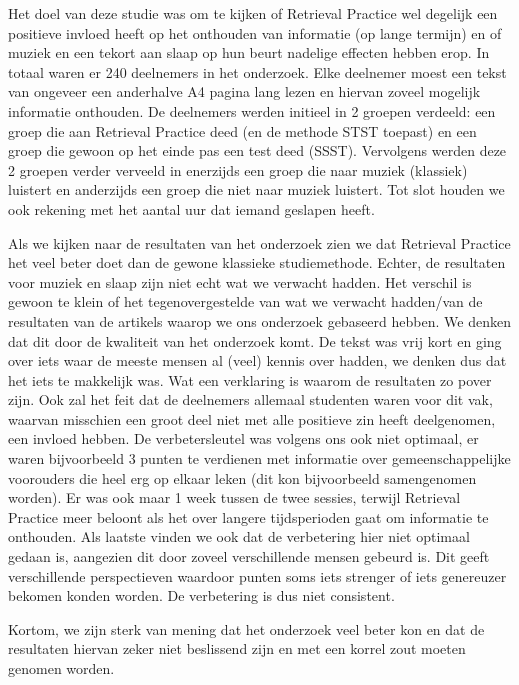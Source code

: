 \documentclass{hogent-article}
\begin{document}
Het doel van deze studie was om te kijken of Retrieval Practice wel degelijk een positieve invloed heeft op het onthouden van informatie (op lange termijn) en of muziek en een tekort aan slaap op hun beurt nadelige effecten hebben erop. In totaal waren er 240 deelnemers in het onderzoek. Elke deelnemer moest een tekst van ongeveer een anderhalve A4 pagina lang lezen en hiervan zoveel mogelijk informatie onthouden. De deelnemers werden initieel in 2 groepen verdeeld: een groep die aan Retrieval Practice deed (en de methode STST toepast) en een groep die gewoon op het einde pas een test deed (SSST). Vervolgens werden deze 2 groepen verder verveeld in enerzijds een groep die naar muziek (klassiek) luistert en anderzijds een groep die niet naar muziek luistert. Tot slot houden we ook rekening met het aantal uur dat iemand geslapen heeft.\\
\par
\noindent
Als we kijken naar de resultaten van het onderzoek zien we dat Retrieval Practice het veel beter doet dan de gewone klassieke studiemethode. Echter, de resultaten voor muziek en slaap zijn niet echt wat we verwacht hadden. Het verschil is gewoon te klein of het tegenovergestelde van wat we verwacht hadden/van de resultaten van de artikels waarop we ons onderzoek gebaseerd hebben. We denken dat dit door de kwaliteit van het onderzoek komt. De tekst was vrij kort en ging over iets waar de meeste mensen al (veel) kennis over hadden, we denken dus dat het iets te makkelijk was. Wat een verklaring is waarom de resultaten zo pover zijn. Ook zal het feit dat de deelnemers allemaal studenten waren voor dit vak, waarvan misschien een groot deel niet met alle positieve zin heeft deelgenomen, een invloed hebben. De verbetersleutel was volgens ons ook niet optimaal, er waren bijvoorbeeld 3 punten te verdienen met informatie over gemeenschappelijke voorouders die heel erg op elkaar leken (dit kon bijvoorbeeld samengenomen worden). Er was ook maar 1 week tussen de twee sessies, terwijl Retrieval Practice meer beloont als het over langere tijdsperioden gaat om informatie te onthouden. Als laatste vinden we ook dat de verbetering hier niet optimaal gedaan is, aangezien dit door zoveel verschillende mensen gebeurd is. Dit geeft verschillende perspectieven waardoor punten soms iets strenger of iets genereuzer bekomen konden worden. De verbetering is dus niet consistent.\\
\par
\noindent
Kortom, we zijn sterk van mening dat het onderzoek veel beter kon en dat de resultaten hiervan zeker niet beslissend zijn en met een korrel zout moeten genomen worden.
\end{document}
